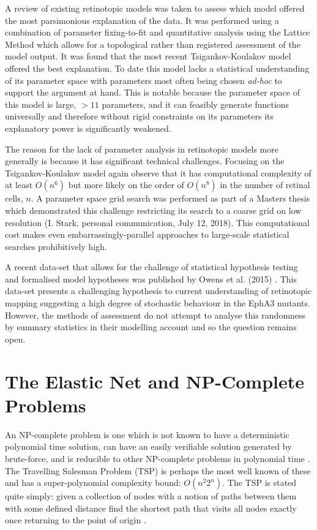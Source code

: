 A review of existing retinotopic models was taken to assess which model offered the most parsimonious explanation of the data. It was performed using a combination of parameter fixing-to-fit and quantitative analysis using the Lattice Method which allows for a topological rather than registered assessment of the model output. It was found that the most recent Tsigankov-Koulakov model offered the best explanation. To date this model lacks a statistical understanding of its parameter space with parameters most often being chosen \textit{ad-hoc} to support the argument at hand. This is notable because the parameter space of this model is large, $>11$ parameters, and it can feasibly generate functions universally and therefore without rigid constraints on its parameters its explanatory power is significantly weakened. 

The reason for the lack of parameter analysis in retinotopic models more generally is because it has significant technical challenges. Focusing on the Tsigankov-Koulakov model again observe that it has computational complexity of at least $O(n^6)$ but more likely on the order of $O(n^8)$ in the number of retinal cells, $n$. A parameter space grid search was performed as part of a Masters thesis which demonstrated this challenge restricting its search to a coarse grid on low resolution (I. Stark, personal communication, July 12, 2018). This computational cost makes even embarrassingly-parallel approaches to large-scale statistical searches prohibitively high.

A recent data-set that allows for the challenge of statistical hypothesis testing and formalised model hypotheses was published by Owens et al. (2015) \cite{Owens2015-zv}. This data-set presents a challenging hypothesis to current understanding of retinotopic mapping suggesting a high degree of stochastic behaviour in the EphA3 mutants. However, the methods of assessment do not attempt to analyse this randomness by summary statistics in their modelling account and so the question remains open. 
\section{The Elastic Net and NP-Complete Problems \label{sec:heuristics}}
An NP-complete problem is one which is not known to have a deterministic polynomial time solution, can have an easily verifiable solution generated by brute-force, and is reducible to other NP-complete problems in polynomial time \cite{Garey1990-th}. The Travelling Salesman Problem (TSP) is perhaps the most well known of these and has a super-polynomial complexity bound: $O(n^2 2^n)$. The TSP is stated quite simply: given a collection of nodes with a notion of paths between them with some defined distance find the shortest path that visits all nodes exactly once returning to the point of origin \cite{Applegate2007-nz}. 

